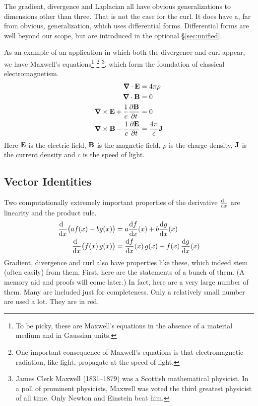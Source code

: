 \noindent The gradient, divergence and Laplacian all have obvious 
generalizations to dimensions other than three. That is not the case for
the curl. It does have a, far from obvious, generalization, which
uses differential forms. Differential forms are well beyond our scope,
but are introduced in the optional \S\ref{sec:unified}.

\begin{eg}\label{eg:ITmaxwell}
As an example of an application in which both the divergence and curl appear,
we have Maxwell's equations\footnote{To be picky, these are Maxwell's
equations in the absence of a material medium and in Gaussian units.}
\footnote{One important consequence of Maxwell's equations is that 
electromagnetic radiation, like light, propagate at the speed of light.}
\footnote{James Clerk Maxwell (1831--1879) was a Scottish mathematical 
physicist. In a poll of prominent physicists, Maxwell was voted the third greatest physicist of all time. Only Newton and Einstein beat him.}, 
which form the foundation of classical electromagnetism.
\begin{align*}
\vnabla\cdot\vE &= 4\pi\rho \\
\vnabla\cdot\vB &= 0 \\
\vnabla\times\vE +\frac{1}{c}\frac{\partial\vB}{\partial t}&=0 \\
\vnabla\times\vB -\frac{1}{c}\frac{\partial\vE}{\partial t}&=\frac{4\pi}{c}\vJ 
\end{align*}
Here $\mathbf{E}$ is the electric field, $\mathbf{B}$ is the magnetic field, $\rho$ is the charge density, $\mathbf{J}$ is the current density and $c$ is the speed of light.
\end{eg}

\subsection{Vector Identities} \label{sec:vectorId}
Two computationally extremely important properties of the derivative
$\diff{\ }{x}$ are linearity and the product rule.
\begin{align*}
\diff{\ }{x}\big(af(x)+bg(x)\big) &=a\diff{f}{x}(x)+b\diff{g}{x}(x) \\
\diff{\ }{x}\big(f(x)\,g(x)\big) &=\diff{f}{x}(x)\,g(x)+f(x)\,\diff{g}{x}(x)
\end{align*}
Gradient, divergence and curl also have properties like these, which 
indeed stem (often easily) from them. First, here are the statements of a bunch of them. (A memory aid and proofs will come later.)  In fact, here are a very large 
number of them. Many are included just for completeness. Only a relatively small number are used a lot. They are in red. 

